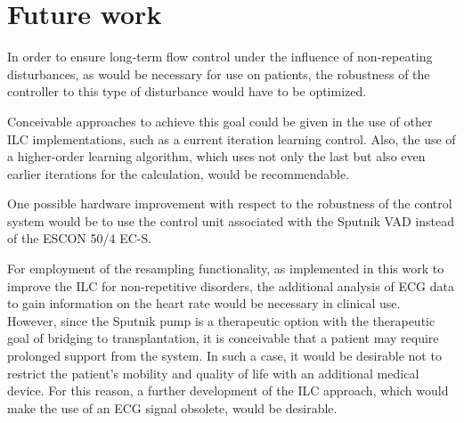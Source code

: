 \section{Future work}
In order to ensure long-term flow control under the influence of non-repeating disturbances, as would be necessary for use on patients, the robustness of the controller to this type of disturbance would have to be optimized.

Conceivable approaches to achieve this goal could be given in the use of other ILC implementations, such as a current iteration learning control. Also, the use of a higher-order learning algorithm, which uses not only the last but also even earlier iterations for the calculation, would be recommendable.

One possible hardware improvement with respect to the robustness of the control system would be to use the control unit associated with the Sputnik VAD instead of the ESCON 50/4 EC-S.

For employment of the resampling functionality, as implemented in this work to improve the ILC for non-repetitive disorders, the additional analysis of ECG data to gain information on the heart rate would be necessary in clinical use.
\\However, since the Sputnik pump is a therapeutic option with the therapeutic goal of bridging to transplantation, it is conceivable that a patient may require prolonged support from the system. In such a case, it would be desirable not to restrict the patient's mobility and quality of life with an additional medical device. For this reason, a further development of the ILC approach, which would make the use of an ECG signal obsolete, would be desirable.
